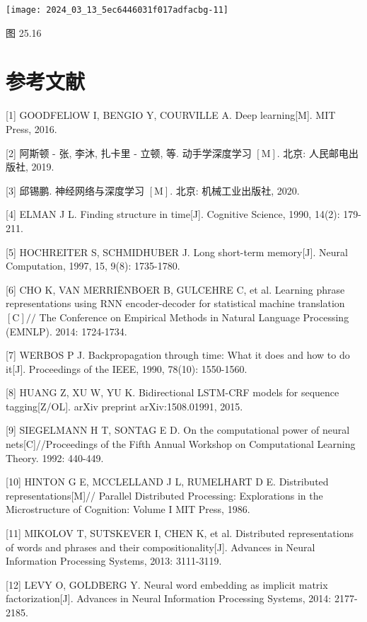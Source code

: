 \documentclass[10pt]{article}
\begin{document}
\begin{center}
\texttt{[image: 2024\_03\_13\_5ec6446031f017adfacbg-11]}
\end{center}

图 25.16

\section*{参考文献}
[1] GOODFELlOW I, BENGIO Y, COURVILLE A. Deep learning[M]. MIT Press, 2016.

[2] 阿斯顿 - 张, 李沐, 扎卡里 - 立顿, 等. 动手学深度学习 $[\mathrm{M}]$. 北京: 人民邮电出版社, 2019.

[3] 邱锡鹏. 神经网络与深度学习 $[\mathrm{M}]$. 北京: 机械工业出版社, 2020.

[4] ELMAN J L. Finding structure in time[J]. Cognitive Science, 1990, 14(2): 179-211.

[5] HOCHREITER S, SCHMIDHUBER J. Long short-term memory[J]. Neural Computation, 1997, 15, 9(8): 1735-1780.

[6] CHO K, VAN MERRIËNBOER B, GULCEHRE C, et al. Learning phrase representations using RNN encoder-decoder for statistical machine translation $[\mathrm{C}] / /$ The Conference on Empirical Methods in Natural Language Processing (EMNLP). 2014: 1724-1734.

[7] WERBOS P J. Backpropagation through time: What it does and how to do it[J]. Proceedings of the IEEE, 1990, 78(10): 1550-1560.

[8] HUANG Z, XU W, YU K. Bidirectional LSTM-CRF models for sequence tagging[Z/OL]. arXiv preprint arXiv:1508.01991, 2015.

[9] SIEGELMANN H T, SONTAG E D. On the computational power of neural nets[C]//Proceedings of the Fifth Annual Workshop on Computational Learning Theory. 1992: 440-449.

[10] HINTON G E, MCCLELLAND J L, RUMELHART D E. Distributed representations[M]// Parallel Distributed Processing: Explorations in the Microstructure of Cognition: Volume I MIT Press, 1986.

[11] MIKOLOV T, SUTSKEVER I, CHEN K, et al. Distributed representations of words and phrases and their compositionality[J]. Advances in Neural Information Processing Systems, 2013: 3111-3119.

[12] LEVY O, GOLDBERG Y. Neural word embedding as implicit matrix factorization[J]. Advances in Neural Information Processing Systems, 2014: 2177-2185.
\end{document}
